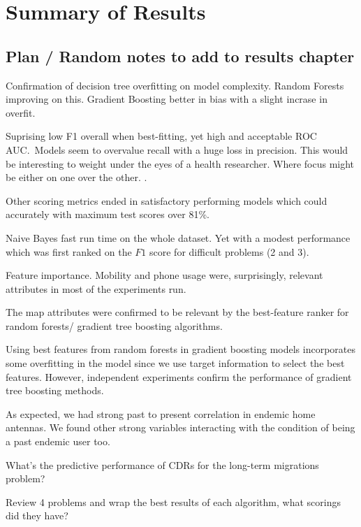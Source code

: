 



\chapter{Summary of Results}\label{ch:results}

\section{Plan / Random notes to add to results chapter}

\begin{description}
    \item Confirmation of decision tree overfitting on model complexity. Random Forests improving on this. Gradient Boosting better in bias with a slight incrase in overfit.
    \item Suprising low F1 overall when best-fitting, yet high and acceptable ROC AUC.\ Models seem to overvalue recall with a huge loss in precision. This would be interesting to weight under the eyes of a health researcher. Where focus might be either on one over the other. .
    \item Other scoring metrics ended in satisfactory performing models which could accurately with maximum test scores over 81\%.
    \item Naive Bayes fast run time on the whole dataset. Yet with a modest performance which was first ranked on the $F1$ score for difficult problems (2 and 3).
    \item [DONE] Feature importance. Mobility and phone usage were, surprisingly, relevant attributes in most of the experiments run.
    \item [DONE] The map attributes were confirmed to be relevant by the best-feature ranker for random forests/ gradient tree boosting algorithms.
    \item Using best features from random forests in gradient boosting models incorporates some overfitting in the model since we use target information to select the best features. However, independent experiments confirm the performance of gradient tree boosting methods.
    \item As expected, we had strong past to present correlation in endemic home antennas. We found other strong variables interacting with the condition of being a past endemic user too.
    \item What's the predictive performance of CDRs for the long-term migrations problem?
    \item Review 4 problems and wrap the best results of each algorithm, what scorings did they have?


\end{description}


